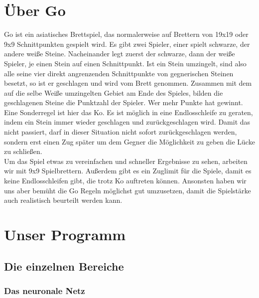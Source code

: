 \documentclass[12pt,a4paper]{article}
\begin{document}
\section{Über Go}
Go ist ein asiatisches Brettspiel, das normalerweise auf Brettern von 19x19 oder 9x9 Schnittpunkten gespielt wird. Es gibt zwei Spieler, einer spielt schwarze, der andere weiße Steine. Nacheinander legt zuerst der schwarze, dann der weiße Spieler, je einen Stein auf einen Schnittpunkt. Ist ein Stein umzingelt, sind also alle seine vier direkt angrenzenden Schnittpunkte von gegnerischen Steinen besetzt, so ist er geschlagen und wird vom Brett genommen. Zusammen mit dem auf die selbe Weiße umzingelten Gebiet am Ende des Spieles, bilden die geschlagenen Steine die Punktzahl der Spieler. Wer mehr Punkte hat gewinnt. Eine Sonderregel ist hier das Ko. Es ist möglich in eine Endlosschleife zu geraten, indem ein Stein immer wieder geschlagen und zurückgeschlagen wird. Damit das nicht passiert, darf in dieser Situation nicht sofort zurückgeschlagen werden, sondern erst einen Zug später um dem Gegner die Möglichkeit zu geben die Lücke zu schließen. 
\\
Um das Spiel etwas zu vereinfachen und schneller Ergebnisse zu sehen, arbeiten wir mit 9x9 Spielbrettern. Außerdem gibt es ein Zuglimit für die Spiele, damit es keine Endlosschleifen gibt, die trotz Ko auftreten können. Ansonsten haben wir uns aber bemüht die Go Regeln möglichst gut umzusetzen, damit die Spielstärke auch realistisch beurteilt werden kann.

\section{Unser Programm}

\subsection{Die einzelnen Bereiche}

\subsubsection{Das neuronale Netz}
\end{document}
